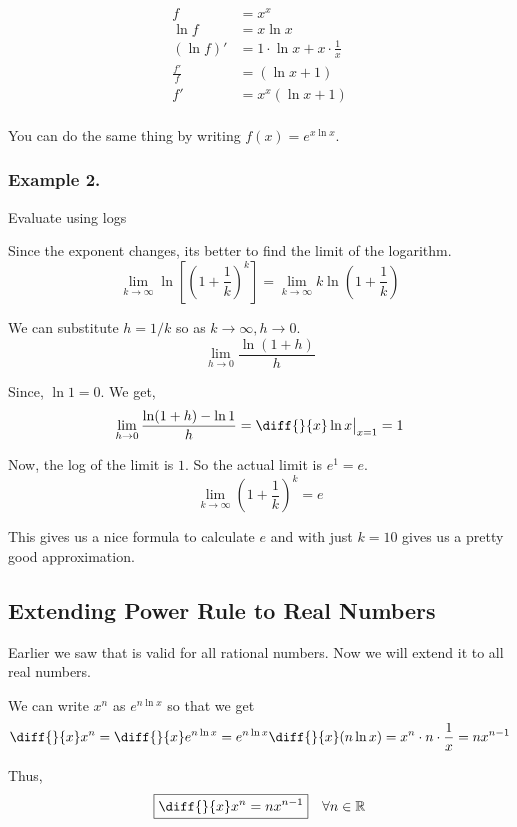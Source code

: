\begin{align*}
	f & = x^x \\
	\ln f & = x \ln x \\
	(\ln f)' & = 1 \cdot \ln x + x \cdot \frac{1}{x} \\
	\frac{f'}{f} & = (\ln x + 1) \\
	f' & = x^x(\ln x + 1) \\
\end{align*}

You can do the same thing by writing $f(x) = e^{x \ln x}$.

\subsubsection{Example 2.}
Evaluate using logs 

Since the exponent changes, its better to find the limit of the logarithm.
$$ 
\lim_{k \to \infty} \ln \left[ \left( 1 + \frac{1}{k} \right)^k \right] 
	= \lim_{k \to \infty} k \ln \left( 1 + \frac{1}{k} \right)
$$

We can substitute $h = 1/k$ so as $k \to \infty, h \to 0$.
$$ \lim_{h \to 0} \frac{\ln(1+h)}{h} $$

Since, $\ln 1 = 0$. We get,
$$ \lim_{h \to 0} \frac{\ln(1+h) - \ln 1}{h} = \diff{}{x} \ln x \big|_{x=1} = 1 $$

Now, the log of the limit is $1$. So the actual limit is $e^1 = e$.
$$ \lim_{k \to \infty} \left( 1 + \frac{1}{k} \right)^k = e $$

This gives us a nice formula to calculate $e$ and with just $k = 10$ gives us a pretty good approximation.


\subsection{Extending Power Rule to Real Numbers}

Earlier we saw that  is valid for all rational numbers.
Now we will extend it to all real numbers. 

We can write $x^n$ as $e^{n \ln x}$ so that we get
$$ \diff{}{x} x^n = \diff{}{x} e^{n \ln x} 
	= e^{n \ln x} \diff{}{x} (n \ln x)
	= x^n \cdot n \cdot \frac{1}{x}
	= n x^{n-1}
$$

Thus, $$ \boxed{ \diff{}{x} x^n = nx^{n-1} } \quad \forall n \in \mathbb{R} $$
